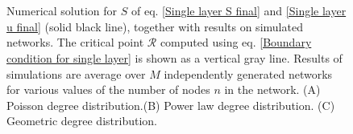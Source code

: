 \documentclass[
11pt, %
english, %
singlespacing, %
nolistspacing, %
liststotoc, %
headsepline, %
]{MastersDoctoralThesis} %
\begin{document}
{
\begin{figure}
	\\
	\\
	\caption{Numerical solution for $S$ of eq. \eqref{Single layer S final} and \eqref{Single layer u final} (solid black line), together with results on simulated networks. The critical point $\mathcal{R}$ computed using eq. \eqref{Boundary condition for single layer} is shown as a vertical gray line. Results of simulations are average over $M$ independently generated networks for various values of the number of nodes $n$ in the network. (A) Poisson degree distribution.(B) Power law degree distribution. (C) Geometric degree distribution. }
	\label{Figure: Single layer S simulation}
\end{figure}
}
\end{document}
